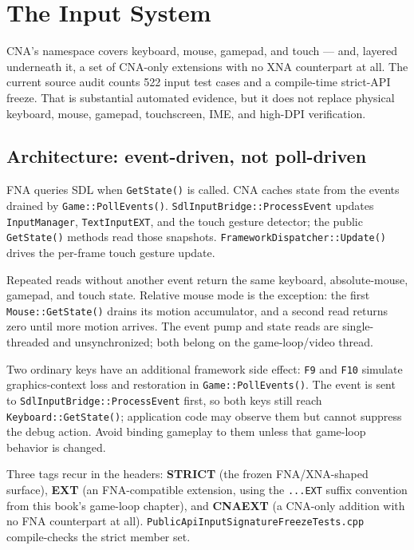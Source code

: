 \chapter{The Input System}
\label{ch:input-system}

CNA's  namespace covers keyboard, mouse, gamepad,
and touch --- and, layered underneath it, a set of CNA-only extensions with no XNA
counterpart at all. The current source audit counts 522 input test cases and a compile-time
strict-API freeze. That is substantial automated evidence, but it does not replace physical
keyboard, mouse, gamepad, touchscreen, IME, and high-DPI verification.

\section{Architecture: event-driven, not poll-driven}

FNA queries SDL when \texttt{GetState()} is called. CNA caches state from the events drained by
\texttt{Game::PollEvents()}. \texttt{SdlInputBridge::ProcessEvent} updates
\texttt{InputManager}, \texttt{TextInputEXT}, and the touch gesture detector; the public
\texttt{GetState()} methods read those snapshots. \texttt{FrameworkDispatcher::Update()} drives
the per-frame touch gesture update.

Repeated reads without another event return the same keyboard, absolute-mouse, gamepad, and touch
state. Relative mouse mode is the exception: the first \texttt{Mouse::GetState()} drains its
motion accumulator, and a second read returns zero until more motion arrives. The event pump and
state reads are single-threaded and unsynchronized; both belong on the game-loop/video thread.

Two ordinary keys have an additional framework side effect: \texttt{F9} and \texttt{F10}
simulate graphics-context loss and restoration in \texttt{Game::PollEvents()}. The event is sent
to \texttt{SdlInputBridge::ProcessEvent} first, so both keys still reach
\texttt{Keyboard::GetState()}; application code may observe them but cannot suppress the debug
action. Avoid binding gameplay to them unless that game-loop behavior is changed.

Three tags recur in the headers: \textbf{STRICT} (the frozen FNA/XNA-shaped surface),
\textbf{EXT} (an FNA-compatible extension, using the \texttt{...EXT} suffix convention from
this book's game-loop chapter), and \textbf{CNAEXT} (a CNA-only addition with no FNA counterpart
at all). \texttt{PublicApiInputSignatureFreezeTests.cpp} compile-checks the strict member set.

